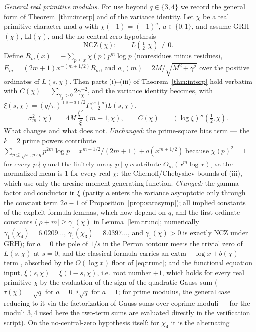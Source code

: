\emph{General real primitive modulus.} For use beyond $q\in\{3,4\}$ we
record the general form of Theorem~\ref{thm:interp} and of the variance
identity. Let $\chi$ be a real primitive character mod $q$ with
$\chi(-1)=(-1)^a$, $a\in\{0,1\}$, and assume GRH$(\chi)$, LI$(\chi)$,
and the no-central-zero hypothesis
\[
\mathrm{NCZ}(\chi):\qquad L(\tfrac12,\chi)\neq0 .
\]
Define $R_m(x)=-\sum_{p\le x}\chi(p)p^m\log p$ (nonresidues minus
residues), $E_m=(2m+1)x^{-(m+1/2)}R_m$, and
$a_\gamma(m)=2M/\sqrt{M^2+\gamma^2}$ over the positive ordinates of
$L(s,\chi)$. Then parts (i)--(iii) of Theorem~\ref{thm:interp} hold
verbatim with $C(\chi)=\sum_{\gamma_\chi>0}2\gamma_\chi^{-2}$, and the
variance identity becomes, with
$\xi(s,\chi)=(q/\pi)^{(s+a)/2}\Gamma\bigl(\tfrac{s+a}2\bigr)L(s,\chi)$,
\[
\sigma_m^2(\chi)\;=\;4M\,\frac{\xi'}{\xi}(m+1,\chi),
\qquad
C(\chi)\;=\;(\log\xi)''(\tfrac12,\chi).
\]
What changes and what does not. \emph{Unchanged:} the prime-square bias
term --- the $k=2$ prime powers contribute
$\sum_{p\le\sqrt x,\,p\nmid q}p^{2m}\log p=x^{m+1/2}/(2m+1)+o(x^{m+1/2})$
because $\chi(p)^2=1$ for every $p\nmid q$ and the finitely many $p\mid q$
contribute $O_m(x^{m}\log x)$, so the normalized mean is $1$ for every
real $\chi$; the Chernoff/Chebyshev bounds of (iii), which use only the
arcsine moment generating function. \emph{Changed:} the gamma factor
and conductor in $\xi$ (parity $a$ enters the variance asymptotic only
through the constant term $2a-1$ of
Proposition~\ref{prop:varasymp}); all implied constants of the
explicit-formula lemmas, which now depend on $q$, and the
first-ordinate constants ($|\rho+m|\ge\gamma_1(\chi)$ in
Lemma~\ref{lem:trunc}; numerically $\gamma_1(\chi_4)=6.0209\ldots$,
$\gamma_1(\chi_3)=8.0397\ldots$, and $\gamma_1(\chi)>0$ is exactly
NCZ under GRH); for $a=0$ the pole of $1/s$ in the Perron contour meets
the trivial zero of $L(s,\chi)$ at $s=0$, and the classical formula
carries an extra $-\log x+b(\chi)$ term \cite[Ch.~19]{Dav00}, absorbed
by the $O(\log x)$ floor of \eqref{eq:trunc}; and the functional
equation input, $\xi(s,\chi)=\xi(1-s,\chi)$, i.e.\ root number $+1$,
which holds for every real primitive $\chi$ by the evaluation of the
sign of the quadratic Gauss sum ($\tau(\chi)=\sqrt q$ for $a=0$,
$i\sqrt q$ for $a=1$; \cite[Ch.~2]{Dav00} for prime modulus, the
general case reducing to it via the factorization of Gauss sums over
coprime moduli --- for the moduli $3,4$ used here the two-term sums
are evaluated directly in the verification script). On the
no-central-zero hypothesis itself: for $\chi_4$ it is the alternating
